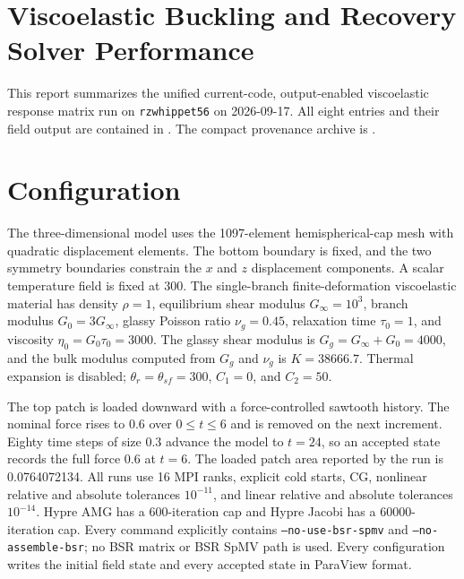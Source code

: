 \documentclass[11pt]{article}
\begin{document}
\sloppy

\section*{Viscoelastic Buckling and Recovery Solver Performance}

This report summarizes the unified current-code, output-enabled viscoelastic
response matrix run on \texttt{rzwhippet56} on 2026-09-17.  All eight entries and
their field output are contained in
.
The compact provenance archive is
.

\section*{Configuration}

The three-dimensional model uses the 1097-element hemispherical-cap mesh
 with quadratic displacement elements.  The
bottom boundary is fixed, and the two symmetry boundaries constrain the $x$ and
$z$ displacement components.  A scalar temperature field is fixed at 300.  The
single-branch finite-deformation viscoelastic material has density $\rho=1$,
equilibrium shear modulus $G_\infty=10^3$, branch modulus
$G_0=3G_\infty$, glassy Poisson ratio $\nu_g=0.45$, relaxation time
$\tau_0=1$, and viscosity $\eta_0=G_0\tau_0=3000$.  The glassy shear
modulus is $G_g=G_\infty+G_0=4000$, and the bulk modulus computed from
$G_g$ and $\nu_g$ is $K=38666.7$.  Thermal expansion is disabled;
$\theta_r=\theta_{sf}=300$, $C_1=0$, and $C_2=50$.

The top patch is loaded downward with a force-controlled sawtooth history.  The
nominal force rises to 0.6 over $0\leq t\leq6$ and is removed on the next
increment.  Eighty time steps of size 0.3 advance the model to $t=24$, so an
accepted state records the full force 0.6 at $t=6$.  The loaded patch area
reported by the run is 0.0764072134.  All runs use 16 MPI ranks, explicit cold starts, CG,
nonlinear relative and absolute tolerances $10^{-11}$, and linear relative and
absolute tolerances $10^{-14}$.  Hypre AMG has a 600-iteration cap and Hypre
Jacobi has a 60000-iteration cap.  Every command explicitly contains
\texttt{--no-use-bsr-spmv} and \texttt{--no-assemble-bsr}; no BSR matrix or BSR
SpMV path is used.  Every configuration writes the initial field state and every
accepted state in ParaView format.
\end{document}
